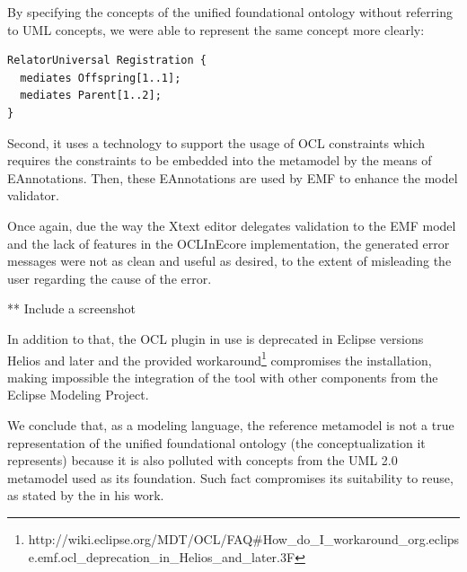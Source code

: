 \documentclass[
	10pt,				%
	oneside,
	a4paper,			%
	brazil,
	english
	]{abntex2}
\begin{document}
By specifying the concepts of the unified foundational ontology without referring
to UML concepts, we were able to represent the same concept more clearly:

\begin{verbatim}
RelatorUniversal Registration {
  mediates Offspring[1..1];
  mediates Parent[1..2];
}
\end{verbatim}

Second, it uses a technology to support the usage of OCL constraints which requires
the constraints to be embedded into the metamodel by the means of EAnnotations.
Then, these EAnnotations are used by EMF to enhance the model validator.

Once again, due the way the Xtext editor delegates validation to the EMF model and
the lack of features in the OCLInEcore implementation, the generated error messages
were not as clean and useful as desired, to the extent of misleading the user
regarding the cause of the error.

** Include a screenshot

In addition to that, the OCL plugin in use is deprecated in Eclipse versions Helios
and later and the provided workaround\footnote{http://wiki.eclipse.org/MDT/OCL/FAQ\#How\_do\_I\_workaround\_org.eclipse.emf.ocl\_deprecation\_in\_Helios\_and\_later.3F} compromises the installation, making impossible the integration
of the tool with other components from the Eclipse Modeling Project.



We conclude that, as a modeling language, the reference metamodel is not a true
representation of the unified foundational ontology (the conceptualization it represents)
because it is also polluted with concepts from the UML 2.0 metamodel used as its foundation.
Such fact compromises its suitability to reuse, as stated by the \cite{carraretto10} in his work.

%
\end{document}

